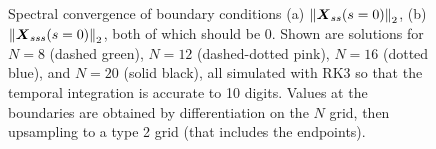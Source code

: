 \begin{figure}
\centering 
{}
\caption{Spectral convergence of boundary conditions (a) $\left\lVert \mbox{\boldmath $ X $}_{ss}(s=0) \right\rVert_2$, (b) $\left\lVert \mbox{\boldmath $ X $}_{sss}(s=0) \right\rVert_2$, both of which should be 0. Shown are solutions for $N=8$ (dashed green), $N=12$ (dashed-dotted pink), $N=16$ (dotted blue), and $N=20$ (solid black), all simulated with RK3 so that the temporal integration is accurate to 10 digits. Values at the boundaries are obtained by differentiation on the $N$ grid, then upsampling to a type 2 grid (that includes the endpoints). }
\label{fig:BCs} 
\end{figure}
